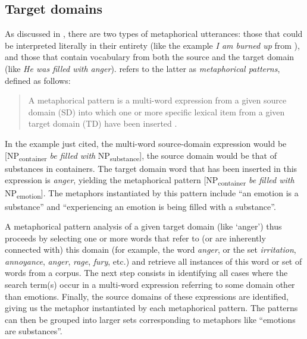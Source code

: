 \subsection{Target domains}
\label{sec:targetdomains}

As discussed in , there are two types of metaphorical  utterances: those that could be interpreted literally  in their entirety (like the example \textit{I am burned up} from \citealt[203]{lakoff_cognitive_1987}), and those that contain vocabulary from both the source and the target domain (like \textit{He was filled with anger}).  \citet{stefanowitsch_happiness_2004, stefanowitsch_words_2006} refers to the latter as \textit{metaphorical patterns}, defined as follows:

\begin{quotation}
A metaphorical  pattern is a multi\hyp{}word expression from a given source domain (SD) into which one or more specific lexical item from a given target domain (TD) have been inserted \citep[66]{stefanowitsch_words_2006}.
\end{quotation}

In the example just cited, the multi\hyp{}word source\hyp{}domain expression would be [NP\textsubscript{container} \textit{be filled with} NP\textsubscript{substance}], the source domain would be that of substances in containers. The target domain word that has been inserted in this expression is \textit{anger},  yielding the metaphorical  pattern [NP\textsubscript{container} \textit{be filled with} NP\textsubscript{emotion}]. The metaphors instantiated by this pattern include ``an emotion is a substance'' and ``experiencing an emotion is being filled with a substance''.

A metaphorical  pattern analysis  of a given target domain (like `anger')  thus proceeds by selecting one or more words that refer to (or are inherently connected with) this domain (for example, the word \textit{anger}, or the set \textit{irritation}, \textit{annoyance}, \textit{anger}, \textit{rage}, \textit{fury}, etc.) and retrieve  all instances of this word or set of words from a corpus. The next step consists in identifying all cases where the search term(s) occur in a multi\hyp{}word expression referring to some domain other than emotions.  Finally, the source domains of these expressions are identified, giving us the metaphor  instantiated by each metaphorical pattern. The patterns can then be grouped into larger sets corresponding to metaphors like ``emotions are substances''.

